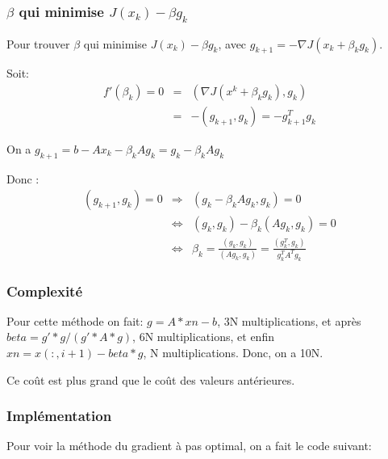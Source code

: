 \documentclass[a4paper,11pt]{article}
\begin{document}
\subsubsection{$\beta$ qui minimise $J(x_k)-\beta g_k$}

Pour trouver $\beta$ qui minimise $J(x_k)-\beta g_k$,
avec $g_{k+1}=-\nabla J(x_k+\beta_kg_k)$.

Soit:
\begin{eqnarray*}
  f'(\beta_k)= 0 &=& (\nabla J(x^k+\beta_kg_k),g_k)\\
  &=&-(g_{k+1},g_k)=-g_{k+1}^Tg_k
\end{eqnarray*}

On a $g_{k+1}= b -Ax_k-\beta_kAg_k=g_k-\beta_kAg_k$

Donc :
\begin{eqnarray*}
  (g_{k+1},g_k) = 0  &\Rightarrow&  (g_k-\beta_kAg_k,g_k)  = 0\\
  & \Leftrightarrow& (g_{k},g_k)-\beta_k(Ag_k,g_k) = 0\\
  & \Leftrightarrow&  \beta_k=\frac{(g_{k},g_k)}{(Ag_k,g_k)}= \frac{(g_{k}^T,g_k)}{g_k^TA^Tg_k}
\end{eqnarray*}

\subsubsection{Complexité}

Pour cette méthode on fait: 
  $g = A*xn-b$, 3N multiplications, et après 
 $ beta = g'*g/(g'*A*g)$, 6N multiplications, et enfin $ xn = x(:,i+1)-beta*g$, N multiplications. Donc, on a 10N.

Ce coût est plus grand que le coût des valeurs antérieures.

\subsubsection{Implémentation}
Pour voir la méthode du gradient à pas optimal, on a fait le code suivant:

\begin{multicols}{2}
  
\end{multicols}
\end{document}
